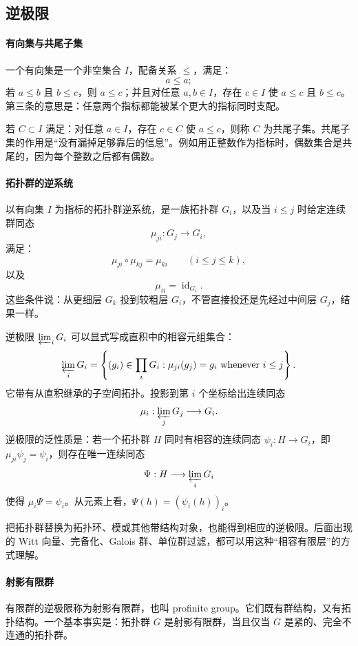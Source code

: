 \documentclass[11pt,a4paper,openany]{ctexbook}
\numberwithin{equation}{chapter}
\theoremstyle{plain}
\theoremstyle{definition}
\theoremstyle{remark}
\begin{document}
\subsection{逆极限}

\paragraph{有向集与共尾子集}
一个有向集是一个非空集合 $I$，配备关系 $\le$，满足：
\[
a\le a;
\]
若 $a\le b$ 且 $b\le c$，则 $a\le c$；并且对任意 $a,b\in I$，存在 $c\in I$ 使 $a\le c$ 且 $b\le c$。第三条的意思是：任意两个指标都能被某个更大的指标同时支配。

若 $C\subset I$ 满足：对任意 $a\in I$，存在 $c\in C$ 使 $a\le c$，则称 $C$ 为共尾子集。共尾子集的作用是“没有漏掉足够靠后的信息”。例如用正整数作为指标时，偶数集合是共尾的，因为每个整数之后都有偶数。

\paragraph{拓扑群的逆系统}
以有向集 $I$ 为指标的拓扑群逆系统，是一族拓扑群 $G_i$，以及当 $i\le j$ 时给定连续群同态
\[
\mu_{ji}:G_j\longrightarrow G_i,
\]
满足：
\[
\mu_{ji}\circ\mu_{kj}=\mu_{ki}\qquad(i\le j\le k),
\]
以及
\[
\mu_{ii}=\operatorname{id}_{G_i}.
\]
这些条件说：从更细层 $G_k$ 投到较粗层 $G_i$，不管直接投还是先经过中间层 $G_j$，结果一样。

逆极限 $\varprojlim_i G_i$ 可以显式写成直积中的相容元组集合：
\[
\varprojlim_i G_i
=\left\{(g_i)\in\prod_iG_i:\mu_{ji}(g_j)=g_i\ \text{whenever }i\le j\right\}.
\]
它带有从直积继承的子空间拓扑。投影到第 $i$ 个坐标给出连续同态
\[
\mu_i:\varprojlim_jG_j\longrightarrow G_i.
\]
逆极限的泛性质是：若一个拓扑群 $H$ 同时有相容的连续同态 $\psi_i:H\to G_i$，即 $\mu_{ji}\psi_j=\psi_i$，则存在唯一连续同态
\[
\Psi:H\longrightarrow \varprojlim_iG_i
\]
使得 $\mu_i\Psi=\psi_i$。从元素上看，$\Psi(h)=(\psi_i(h))_i$。

把拓扑群替换为拓扑环、模或其他带结构对象，也能得到相应的逆极限。后面出现的 Witt 向量、完备化、Galois 群、单位群过滤，都可以用这种“相容有限层”的方式理解。

\paragraph{射影有限群}
有限群的逆极限称为射影有限群，也叫 profinite group。它们既有群结构，又有拓扑结构。一个基本事实是：拓扑群 $G$ 是射影有限群，当且仅当 $G$ 是紧的、完全不连通的拓扑群。
\end{document}
